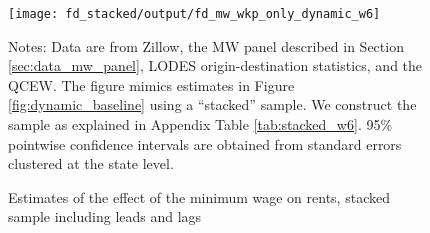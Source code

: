 
\begin{figure}[h!]
    \centering
    \caption{Estimates of the effect of the minimum wage on rents, stacked sample including
             leads and lags}
    \label{fig:dynamic_stacked}

    \texttt{[image: fd\_stacked/output/fd\_mw\_wkp\_only\_dynamic\_w6]}

    \begin{minipage}{.95\textwidth} \footnotesize
        \vspace{3mm}
        Notes:
        Data are from Zillow,
        the MW panel described in Section \ref{sec:data_mw_panel},
        LODES origin-destination statistics,
        and the QCEW.
        The figure mimics estimates in Figure \ref{fig:dynamic_baseline} 
        using a ``stacked'' sample.
        We construct the sample as explained in Appendix Table \ref{tab:stacked_w6}.
        95\% pointwise confidence intervals are obtained from standard errors 
        clustered at the state level.
    \end{minipage}
\end{figure}
